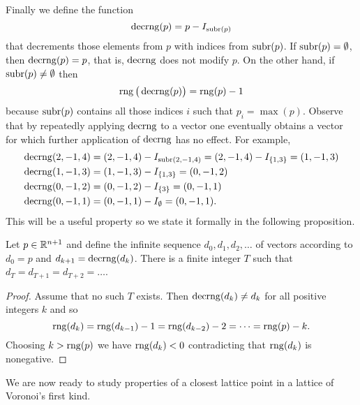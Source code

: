 \documentclass[final,leqno]{siamltex}
\begin{document}
Finally we define the function
\[
\operatorname{decrng}(p) = p -  I_{\operatorname{subr}(p)}
\]
that decrements those elements from $p$ with indices from $\operatorname{subr}(p)$.  If $\operatorname{subr}(p) = \emptyset$, then $\operatorname{decrng}(p) = p$, that is, $\operatorname{decrng}$ does not modify $p$.  On the other hand, if $\operatorname{subr}(p) \neq \emptyset$ then
\[
\operatorname{rng}\big(\operatorname{decrng}(p)\big) = \operatorname{rng}(p) - 1
\]
because $\operatorname{subr}(p)$ contains all those indices $i$ such that $p_i = \max(p)$.  Observe that by repeatedly applying $\operatorname{decrng}$ to a vector one eventually obtains a vector for which further application of $\operatorname{decrng}$ has no effect.  For example,
\begin{align*}
\operatorname{decrng}(2,-1,4) &= (2,-1,4) - I_{\operatorname{subr}(2,-1,4)} = (2,-1,4) - I_{\{1,3\}} = (1,-1,3) \\ 
\operatorname{decrng}(1,-1,3) &= (1,-1,3) - I_{\{1,3\}} = (0,-1,2) \\ 
\operatorname{decrng}(0,-1,2) &= (0,-1,2) - I_{\{3\}} = (0,-1,1) \\ 
\operatorname{decrng}(0,-1,1) &= (0,-1,1) - I_{\emptyset} = (0,-1,1).
\end{align*}
This will be a useful property so we state it formally in the following proposition.

\begin{proposition} \label{lem:repeatappdecrange} Let $p \in {\mathbb R}^{n+1}$ and define the infinite sequence $d_0,d_1,d_2,\dots$ of vectors according to $d_0=p$ and $d_{k+1} = \operatorname{decrng}(d_k)$.  There is a finite integer $T$ such that $d_T=d_{T+1}=d_{T+2}=\dots$.
\end{proposition}
\begin{proof}
Assume that no such $T$ exists.  Then $\operatorname{decrng}(d_k) \neq d_k$ for all positive integers $k$ and so 
\[
\operatorname{rng}(d_{k}) = \operatorname{rng}(d_{k-1}) - 1 = \operatorname{rng}(d_{k-2}) - 2 = \dots = \operatorname{rng}(p) - k.
\]  
Choosing $k > \operatorname{rng}(p)$ we have $\operatorname{rng}(d_{k}) < 0$ contradicting that $\operatorname{rng}(d_k)$ is nonegative.
\end{proof}

We are now ready to study properties of a closest lattice point in a lattice of Voronoi's first kind.
\end{document}
